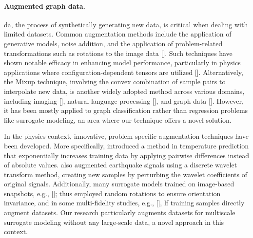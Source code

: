\paragraph{Augmented graph data.} \ac{da}, the process of synthetically generating new data, is critical when dealing with limited datasets. Common augmentation methods include the application of generative models, noise addition, and the application of problem-related transformations such as rotations to the image data [\cite{mumuni2022}]. Such techniques have shown notable efficacy in enhancing model performance, particularly in physics applications where configuration-dependent tensors are utilized [\cite{cheung2023}]. Alternatively, the Mixup technique, involving the convex combination of sample pairs to interpolate new data, is another widely adopted method across various domains, including imaging [\cite{guo2019,zhang2018}], natural language processing [\cite{jindal2020,guo2020}], and graph data [\cite{han2022,wang2021}]. However, it has been mostly applied to graph classification rather than regression problems like surrogate modeling, an area where our technique offers a novel solution.

In the physics context, innovative, problem-specific augmentation techniques have been developed. More specifically, \cite{zhao2021} introduced a method in temperature prediction that exponentially increases training data by applying pairwise differences instead of absolute values. \cite{parida2023a} also augmented earthquake signals using a discrete wavelet transform method, creating new samples by perturbing the wavelet coefficients of original signals. Additionally, many surrogate models trained on image-based snapshots, e.g., [\cite{dong2022}]; thus employed random rotations to ensure orientation invariance, and in some multi-fidelity studies, e.g., [\cite{sella2023}], \ac{lf} training samples directly augment datasets. Our research particularly augments datasets for multiscale surrogate modeling without any large-scale data, a novel approach in this context.

